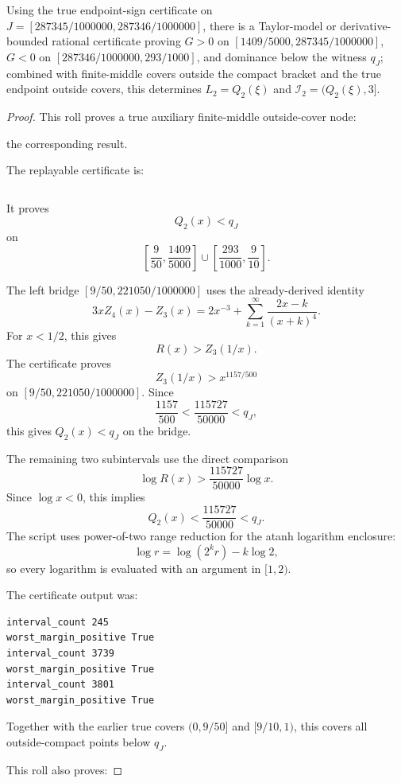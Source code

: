 \begin{proposition}
\label{res:q2-compact-taylor-monotonicity-j-terminal-certificate}
Using the true endpoint-sign certificate on \(J=[287345/1000000,287346/1000000]\), there is a Taylor-model or derivative-bounded rational certificate proving \(G>0\) on \([1409/5000,287345/1000000]\), \(G<0\) on \([287346/1000000,293/1000]\), and dominance below the witness \(q_J\); combined with finite-middle covers outside the compact bracket and the true endpoint outside covers, this determines \(L_2=Q_2(\xi)\) and \(\mathcal I_2=(Q_2(\xi),3]\).
\end{proposition}
\begin{proof}
This roll proves a true auxiliary finite-middle outside-cover node:

the corresponding result.

The replayable certificate is:

\begin{verbatim}
\end{verbatim}

It proves
\[
Q_2(x)<q_J
\]
on
\[
\left[\frac9{50},\frac{1409}{5000}\right]
\cup
\left[\frac{293}{1000},\frac9{10}\right].
\]

The left bridge \([9/50,221050/1000000]\) uses the already-derived identity
\[
3xZ_4(x)-Z_3(x)
=2x^{-3}+\sum_{k=1}^{\infty}\frac{2x-k}{(x+k)^4}.
\]
For \(x<1/2\), this gives
\[
R(x)>Z_3(1/x).
\]
The certificate proves
\[
Z_3(1/x)>x^{1157/500}
\]
on \([9/50,221050/1000000]\). Since
\[
\frac{1157}{500}<\frac{115727}{50000}<q_J,
\]
this gives \(Q_2(x)<q_J\) on the bridge.

The remaining two subintervals use the direct comparison
\[
\log R(x)>\frac{115727}{50000}\log x.
\]
Since \(\log x<0\), this implies
\[
Q_2(x)<\frac{115727}{50000}<q_J.
\]
The script uses power-of-two range reduction for the atanh logarithm enclosure:
\[
\log r=\log(2^k r)-k\log 2,
\]
so every logarithm is evaluated with an argument in \([1,2)\).

The certificate output was:

\begin{verbatim}
interval_count 245
worst_margin_positive True
interval_count 3739
worst_margin_positive True
interval_count 3801
worst_margin_positive True
\end{verbatim}

Together with the earlier true covers \((0,9/50]\) and \([9/10,1)\), this covers all outside-compact points below \(q_J\).

This roll also proves:


\end{proof}
